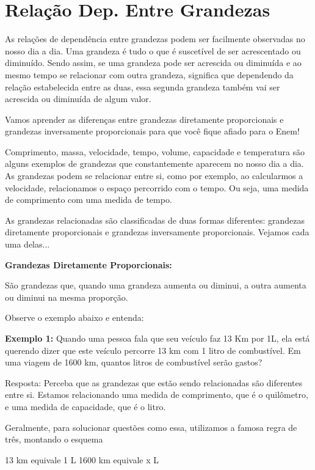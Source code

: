 \begin{multicols*}{2}
\begin{enumerate}
	\end{enumerate}

	\section{Relação Dep. Entre Grandezas}

	As relações de dependência entre grandezas podem ser facilmente observadas no nosso dia a dia. Uma grandeza é tudo o que é suscetível de ser acrescentado ou diminuído. Sendo assim, se uma grandeza pode ser acrescida ou diminuída e ao mesmo tempo se relacionar com outra grandeza, significa que dependendo da relação estabelecida entre as duas, essa segunda grandeza também vai ser acrescida ou diminuída de algum valor.

	Vamos aprender as diferenças entre grandezas diretamente proporcionais e grandezas inversamente proporcionais para que você fique afiado para o Enem!

	Comprimento, massa, velocidade, tempo, volume, capacidade e temperatura são alguns exemplos de grandezas que constantemente aparecem no nosso dia a dia. As grandezas podem se relacionar entre si,  como por exemplo, ao calcularmos a velocidade, relacionamos o espaço percorrido com o tempo. Ou seja, uma medida de comprimento com uma medida de tempo.

	As grandezas relacionadas são classificadas de duas formas diferentes: grandezas diretamente proporcionais  e grandezas inversamente proporcionais. Vejamos cada uma delas...

	\textbf{Grandezas Diretamente Proporcionais:}

	São grandezas que, quando uma grandeza aumenta ou diminui, a outra aumenta ou diminui na mesma proporção.

	Observe o exemplo abaixo e entenda:

	\textbf{Exemplo 1:} Quando uma pessoa fala que seu veículo faz 13 Km por 1L, ela está querendo dizer que este veículo percorre 13 km com 1 litro de combustível. Em uma viagem de 1600 km, quantos litros de combustível serão gastos?

	Resposta: Perceba que as grandezas que estão sendo relacionadas são diferentes entre si. Estamos relacionando uma medida de comprimento, que é o quilômetro, e uma medida de capacidade, que é o litro.

	Geralmente, para solucionar questões como essa, utilizamos a famosa regra de três, montando o esquema

	13 km   equivale 1 L
	1600 km equivale x L


\end{multicols*}
